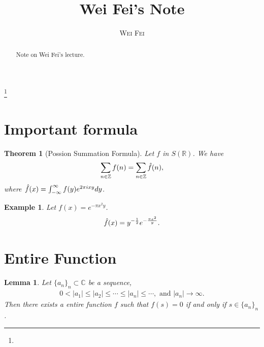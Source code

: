 \documentclass[a4paper,10pt]{amsart}
\newtheorem{example}{Example}[section]
\newtheorem{theorem}{Theorem}[section]
\newtheorem{lemma}{Lemma}[section]
\newcommand{\C}{\mathbb C} %
\newcommand{\R}{\mathbb R}  %
\newcommand{\Z}{\mathbb Z} %
\newcommand{\titleinfo}{Wei Fei's Note}
\newcommand{\authorinfo}{Wei Fei}
\begin{document}
\title{\LARGE\textbf{\titleinfo}} 

\author{\large\textsc{\authorinfo}} 
\address{AMSS}  
\email{}

\date{}


\begin{abstract}
    Note on Wei Fei's lecture.
\end{abstract}


\thanks{}

\maketitle

\section{Important formula}

\begin{theorem}[Possion Summation Formula]
    Let $f$ in $S(\R)$. We have
    \begin{align*}
        \sum_{n \in \Z}f(n) = \sum_{n \in \Z} \Hat{f}(n), 
    \end{align*}
    where $\Hat{f}(x) = \int_{-\infty}^{\infty}f(y)e^{2\pi i xy}dy$.
\end{theorem}

\begin{example}
    Let $f(x) = e^{-\pi x^2 y}$.
    \begin{align*}
        \Hat{f}(x)= y^{-\frac{1}{2}}e^{-\frac{\pi x^2}{y}}. 
    \end{align*}
\end{example}

\section{Entire Function}

\begin{lemma}
Let $\{a_{n}\}_{n} \subset \C$ be a sequence, 
\begin{align*}
    0 < |a_{1}| \leq |a_{2}| \leq \cdots \leq |a_{n}| \leq \cdots,
    \mbox{ and } |a_{n}| \rightarrow \infty.
\end{align*}
Then there exists a entire function $f$ such that $f(s) = 0$ if and 
only if $s \in \{a_{n}\}_{n}$.
\end{lemma}
\end{document}
